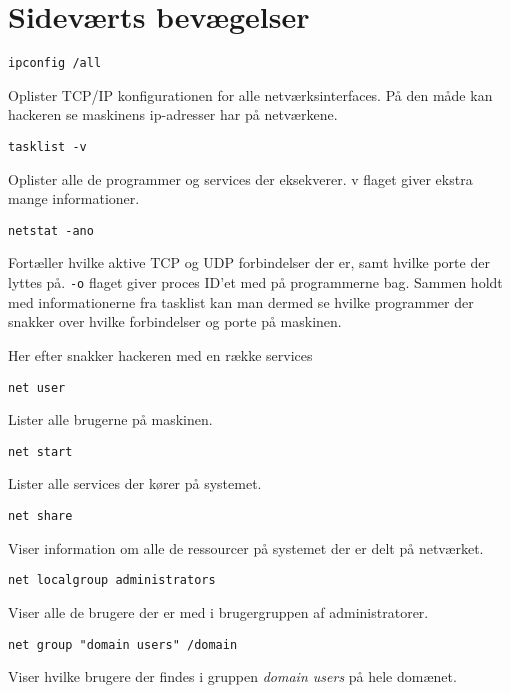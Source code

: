 \documentclass[10pt,a4paper,danish]{article}
\begin{document}

\section{}

\section{Sideværts bevægelser}

\begin{verbatim}
ipconfig /all
\end{verbatim}
Oplister TCP/IP konfigurationen for alle netværksinterfaces.
På den måde kan hackeren se maskinens ip-adresser har på netværkene.

\begin{verbatim}
tasklist -v
\end{verbatim}
Oplister alle de programmer og services der eksekverer. v flaget giver ekstra
mange informationer.

\begin{verbatim}
netstat -ano
\end{verbatim}
Fortæller hvilke aktive TCP og UDP forbindelser der er, samt hvilke porte der
lyttes på. \texttt{-o} flaget giver proces ID'et med på programmerne bag.
Sammen holdt med informationerne fra tasklist kan man dermed se hvilke
programmer der snakker over hvilke forbindelser og porte på maskinen.

Her efter snakker hackeren med en række services

\begin{verbatim}
net user
\end{verbatim}
Lister alle brugerne på maskinen.

\begin{verbatim}
net start
\end{verbatim}
Lister alle services der kører på systemet.

\begin{verbatim}
net share
\end{verbatim}
Viser information om alle de ressourcer på systemet der er delt på netværket.

\begin{verbatim}
net localgroup administrators
\end{verbatim}
Viser alle de brugere der er med i brugergruppen af administratorer.

\begin{verbatim}
net group "domain users" /domain
\end{verbatim}
Viser hvilke brugere der findes i gruppen \textit{domain users} på hele domænet.
\end{document}
